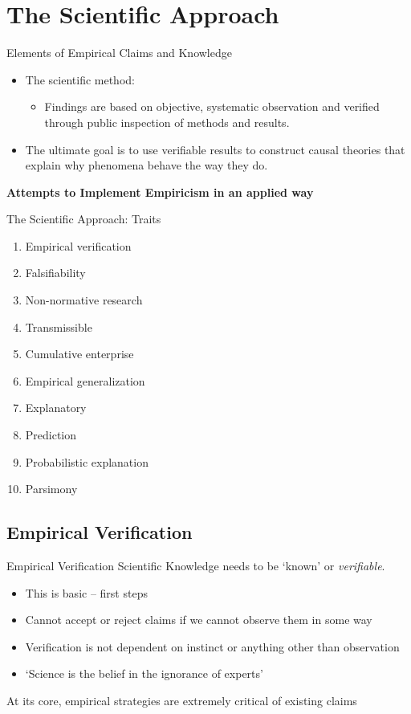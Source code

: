 \documentclass{beamer}
\begin{document}
\section{The Scientific Approach}
\begin{frame}{Elements of Empirical Claims and Knowledge}
\begin{itemize}
\item The scientific method:
\begin{itemize}
\item Findings are based on objective, systematic observation and verified through public inspection of methods and results.
\end{itemize}
\item The ultimate goal is to use verifiable results to construct causal theories that explain why phenomena behave the way they do.
\end{itemize} 
\textbf{Attempts to Implement Empiricism in an applied way}
\end{frame}
\begin{frame}{The Scientific Approach: Traits}
\begin{enumerate}
\item Empirical verification
\item Falsifiability
\item Non-normative research
\item Transmissible
\item Cumulative enterprise
\item Empirical generalization
\item Explanatory
\item Prediction
\item Probabilistic explanation
\item Parsimony
\end{enumerate}
\end{frame}
\subsection{Empirical Verification}
\begin{frame}{Empirical Verification}
Scientific Knowledge needs to be `known' or \textit{verifiable}.
\begin{itemize}
\item This is basic -- first steps
\item Cannot accept or reject claims if we cannot observe them in some way
\item Verification is not dependent on instinct or anything other than observation
\item `Science is the belief in the ignorance of experts'
\end{itemize}
At its core, empirical strategies are extremely critical of existing claims
\end{frame}
\end{document}
